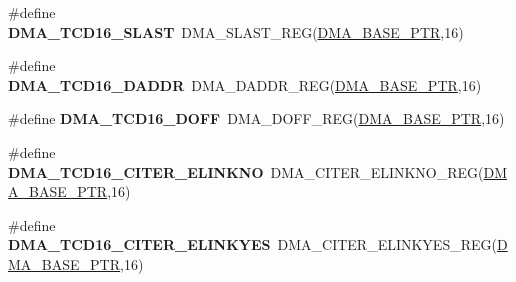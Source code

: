 \begin{DoxyCompactItemize}
\item 
\hypertarget{group___d_m_a___register___accessor___macros_gadf6bd86cf7ba478c9f69cb21addbadad}{}\#define {\bfseries D\+M\+A\+\_\+\+T\+C\+D16\+\_\+\+S\+L\+A\+S\+T}~D\+M\+A\+\_\+\+S\+L\+A\+S\+T\+\_\+\+R\+E\+G(\hyperlink{group___d_m_a___peripheral_ga6997fbc1b1973e9f27170217a3bd6f22}{D\+M\+A\+\_\+\+B\+A\+S\+E\+\_\+\+P\+T\+R},16)\label{group___d_m_a___register___accessor___macros_gadf6bd86cf7ba478c9f69cb21addbadad}

\item 
\hypertarget{group___d_m_a___register___accessor___macros_ga7bb3c6f30fe4bb5b3cec2a933c175600}{}\#define {\bfseries D\+M\+A\+\_\+\+T\+C\+D16\+\_\+\+D\+A\+D\+D\+R}~D\+M\+A\+\_\+\+D\+A\+D\+D\+R\+\_\+\+R\+E\+G(\hyperlink{group___d_m_a___peripheral_ga6997fbc1b1973e9f27170217a3bd6f22}{D\+M\+A\+\_\+\+B\+A\+S\+E\+\_\+\+P\+T\+R},16)\label{group___d_m_a___register___accessor___macros_ga7bb3c6f30fe4bb5b3cec2a933c175600}

\item 
\hypertarget{group___d_m_a___register___accessor___macros_gabe17e86f51f8116f3c0bb55aea3e53ef}{}\#define {\bfseries D\+M\+A\+\_\+\+T\+C\+D16\+\_\+\+D\+O\+F\+F}~D\+M\+A\+\_\+\+D\+O\+F\+F\+\_\+\+R\+E\+G(\hyperlink{group___d_m_a___peripheral_ga6997fbc1b1973e9f27170217a3bd6f22}{D\+M\+A\+\_\+\+B\+A\+S\+E\+\_\+\+P\+T\+R},16)\label{group___d_m_a___register___accessor___macros_gabe17e86f51f8116f3c0bb55aea3e53ef}

\item 
\hypertarget{group___d_m_a___register___accessor___macros_gabbae6f7e72ee2ddd707f8e17b2db6c13}{}\#define {\bfseries D\+M\+A\+\_\+\+T\+C\+D16\+\_\+\+C\+I\+T\+E\+R\+\_\+\+E\+L\+I\+N\+K\+N\+O}~D\+M\+A\+\_\+\+C\+I\+T\+E\+R\+\_\+\+E\+L\+I\+N\+K\+N\+O\+\_\+\+R\+E\+G(\hyperlink{group___d_m_a___peripheral_ga6997fbc1b1973e9f27170217a3bd6f22}{D\+M\+A\+\_\+\+B\+A\+S\+E\+\_\+\+P\+T\+R},16)\label{group___d_m_a___register___accessor___macros_gabbae6f7e72ee2ddd707f8e17b2db6c13}

\item 
\hypertarget{group___d_m_a___register___accessor___macros_gadcbee1986aafe28051d45c41c7188418}{}\#define {\bfseries D\+M\+A\+\_\+\+T\+C\+D16\+\_\+\+C\+I\+T\+E\+R\+\_\+\+E\+L\+I\+N\+K\+Y\+E\+S}~D\+M\+A\+\_\+\+C\+I\+T\+E\+R\+\_\+\+E\+L\+I\+N\+K\+Y\+E\+S\+\_\+\+R\+E\+G(\hyperlink{group___d_m_a___peripheral_ga6997fbc1b1973e9f27170217a3bd6f22}{D\+M\+A\+\_\+\+B\+A\+S\+E\+\_\+\+P\+T\+R},16)\label{group___d_m_a___register___accessor___macros_gadcbee1986aafe28051d45c41c7188418}


\end{DoxyCompactItemize}
